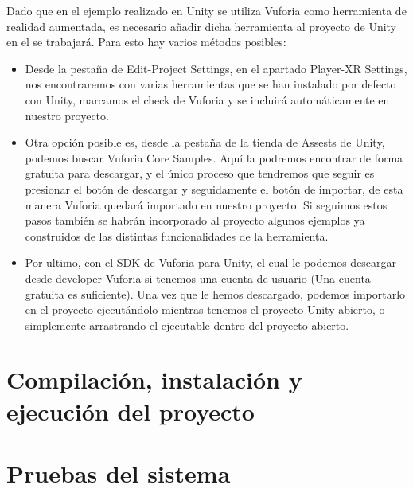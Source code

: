 Dado que en el ejemplo realizado en Unity se utiliza Vuforia como herramienta de realidad aumentada, es necesario añadir dicha herramienta al proyecto de Unity en el se trabajará. Para esto hay varios métodos posibles:
\begin{itemize}
\item Desde la pestaña de Edit-Project Settings, en el apartado Player-XR Settings, nos encontraremos con varias herramientas que se han instalado por defecto con Unity, marcamos el check de Vuforia y se incluirá automáticamente en nuestro proyecto.

\item Otra opción posible es, desde la pestaña de la tienda de Assests de Unity, podemos buscar Vuforia Core Samples. Aquí la podremos encontrar de forma gratuita para descargar, y el único proceso que tendremos que seguir es presionar el botón de descargar y seguidamente el botón de importar, de esta manera Vuforia quedará importado en nuestro proyecto. Si seguimos estos pasos también se habrán incorporado al proyecto algunos ejemplos ya construidos de las distintas funcionalidades de la herramienta.

\item Por ultimo, con el SDK de Vuforia para Unity, el cual le podemos descargar desde \href{https://developer.vuforia.com/downloads/sdk}{developer Vuforia} si tenemos una cuenta de usuario (Una cuenta gratuita es suficiente). Una vez que le hemos descargado, podemos importarlo en el proyecto ejecutándolo mientras tenemos el proyecto Unity abierto, o simplemente arrastrando el ejecutable dentro del proyecto abierto.	
\end{itemize}


\section{Compilación, instalación y ejecución del proyecto}

\section{Pruebas del sistema}
